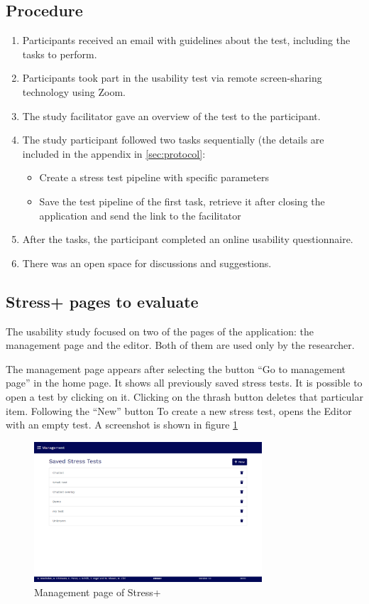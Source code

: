 \documentclass[conference]{IEEEtran}
\begin{document}
\subsection{Procedure}
\label{sec:orgf3f1b2d}
\begin{enumerate}
\item Participants received an email with guidelines about the test, including
the tasks to perform.
\item Participants took part in the usability test via remote screen-sharing
technology using Zoom.
\item The study facilitator gave an overview of the test to the participant.
\item The study participant followed two tasks sequentially (the details are included
in the appendix in \ref{sec:protocol}:
\begin{itemize}
\item Create a stress test pipeline with specific parameters
\item Save the test pipeline of the first task, retrieve it after closing the
application and send the link to the facilitator
\end{itemize}
\item After the tasks, the participant completed an online usability
questionnaire.
\item There was an open space for discussions and suggestions.
\end{enumerate}

\subsection{Stress+ pages to evaluate}
\label{sec:stresspluss}
The usability study focused on two of the pages of the application: the
management page and the editor. Both of them are used only by the researcher.

The management page appears after selecting the button ``Go to management page''
in the home page. It shows all previously saved stress tests. It is possible to
open a test by clicking on it. Clicking on the thrash button deletes that
particular item. Following the ``New'' button To create a new stress test, opens
the Editor with an empty test. A screenshot is shown in figure \ref{mgmt-page}

\begin{figure}[t!]
\centering
\includegraphics[width=8.5cm]{AttrakDiff/screenshot-management-page.png}
\caption{\label{mgmt-page}Management page of Stress+}
\end{figure}
\end{document}
